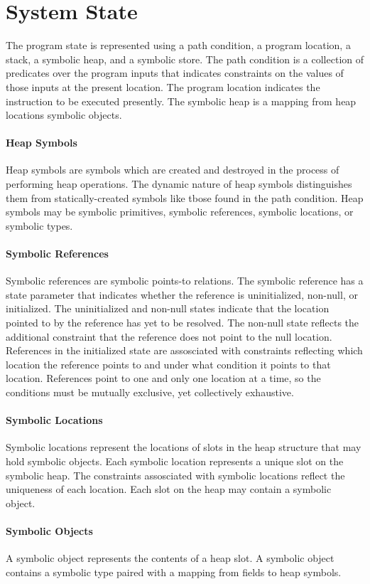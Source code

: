 \section{System State}
The program state is represented using a path condition, a program location, a stack, a symbolic heap, and a symbolic store. The path condition is a collection of predicates over the program inputs that indicates constraints on the values of those inputs at the present location. The program location indicates the instruction to be executed presently. The symbolic heap is a mapping from heap locations symbolic objects. 
\paragraph{Heap Symbols}
Heap symbols are symbols which are created and destroyed in the process of performing heap operations. The dynamic nature of heap symbols distinguishes them from statically-created symbols like tbose found in the path condition. Heap symbols may be symbolic primitives, symbolic references, symbolic locations, or symbolic types.
\paragraph{Symbolic References}
Symbolic references are symbolic points-to relations. The symbolic reference has a state parameter that indicates whether the reference is uninitialized, non-null, or initialized. The uninitialized and non-null states indicate that the location pointed to by the reference has yet to be resolved. The non-null state reflects the additional constraint that the reference does not point to the null location. References in the initialized state are assosciated with constraints reflecting which location the reference points to and under what condition it points to that location. References point to one and only one location at a time, so the conditions must be mutually exclusive, yet collectively exhaustive.
\paragraph{Symbolic Locations}
Symbolic locations represent the locations of slots in the heap structure that may hold symbolic objects. Each symbolic location represents a unique slot on the symbolic heap. The constraints assosciated with symbolic locations reflect the uniqueness of each location. Each slot on the heap may contain a symbolic object. 
\paragraph{Symbolic Objects}
A symbolic object represents the contents of a heap slot. A symbolic object contains a symbolic type paired with a mapping from fields to heap symbols.
